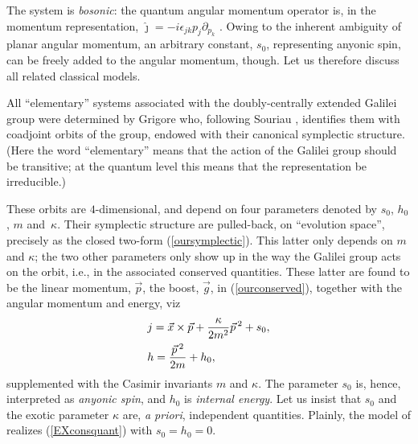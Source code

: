 \documentclass[a4paper,11pt]{article}
\let\ssection=\section
\renewcommand{\section}{\setcounter{equation}{0}\ssection}
\newcommand{\vx}{{\vec x}}
\def\p{{\partial}}
\def\vg{{\vec k}}
\def\vp{{\vec p}}
\def\vg{{\vec g}}
\def\vx{{\vec x}}
\begin{document}
The system is {\it bosonic}:
the quantum angular momentum operator is,  in the momentum representation,
$
\widehat{\jmath} =-i\epsilon_{jk}p_{j}\p_{p_{k}}
$
\cite{centralex1,DH,GRIG}.
Owing to the inherent ambiguity
of planar angular momentum, an arbitrary constant, $s_{0}$,
representing anyonic spin, can be freely added
to the angular momentum, though.
Let us therefore discuss all related classical models.


All ``elementary'' systems  associated with the doubly-centrally
extended Galilei group were
determined by Grigore \cite{GRIG} who,  following Souriau
\cite{SSD}, identifies them with
 coadjoint orbits of the group, endowed with their
canonical symplectic structure. (Here the word ``elementary''
means that the action of the Galilei group should be transitive;
at the quantum level this means that the representation be
irreducible.)

These orbits are $4$-dimensional, and depend on four
parameters denoted by $s_{0}$, $h_0$, $m$ and~$\kappa$. Their
symplectic structure are pulled-back, on ``evolution space'', precisely as the
closed two-form (\ref{oursymplectic}). This latter only depends on
$m$ and $\kappa$; the two other parameters only show up
in the way the Galilei group acts on the orbit, i.e.,
in the associated conserved quantities. These latter are
found to be the linear momentum, $\vp$, the boost, $\vg$, in
(\ref{ourconserved}), together with the angular momentum and energy, viz
  \goodbreak
\begin{equation}
\begin{array}{c}
j=\vx\times\vp+\displaystyle\frac{\kappa}{2m^2}\vp{\,}^2+
s_{0},
\\[8pt]
h=\displaystyle\frac{\vp{\,}^2}{2m}+h_0,\hfill
\end{array}
\label{EXconsquant}
\end{equation}
supplemented with the Casimir invariants $m$ and $\kappa$.
The parameter $s_{0}$ is, hence, interpreted as {\it anyonic spin}, and
$h_0$ is {\it internal energy}.  Let us insist that $s_0$ and the exotic
parameter $\kappa$ are, {\it a priori}, independent quantities.
Plainly, the model of \cite{DH}
realizes (\ref{EXconsquant}) with $s_0=h_0=0$.
\end{document}
